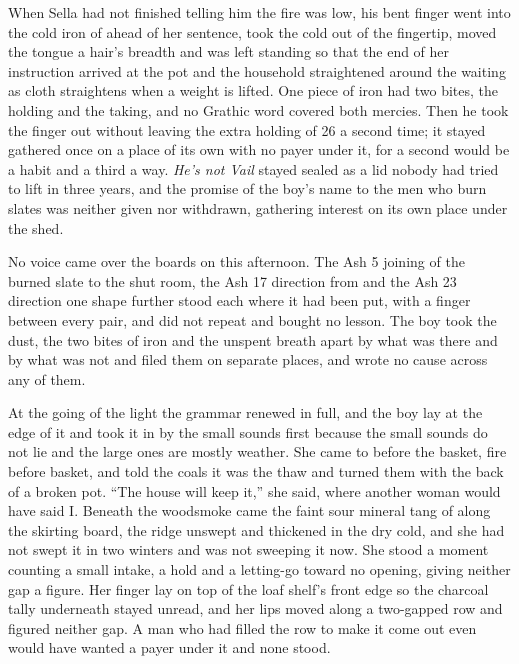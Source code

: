 When Sella had not finished telling him the fire was low, his bent finger went into the cold iron of  ahead of her sentence, took the cold out of the fingertip, moved the tongue a hair's breadth and was left standing so that the end of her instruction arrived at the pot and the household straightened around the waiting as cloth straightens when a weight is lifted. One piece of iron had two bites, the holding and the taking, and no Grathic word covered both mercies. Then he took the finger out without leaving the extra holding of  26 a second time; it stayed gathered once on a place of its own with no payer under it, for a second would be a habit and a third a way. \emph{He's not Vail} stayed sealed as a lid nobody had tried to lift in three years, and the promise of the boy's name to the men who burn slates was neither given nor withdrawn, gathering interest on its own place under the shed.

No voice came over the boards on this afternoon. The Ash 5 joining of the burned slate to the shut room, the Ash 17 direction from  and the Ash 23 direction one shape further stood each where it had been put, with a finger between every pair, and did not repeat and bought no lesson. The boy took the dust, the two bites of iron and the unspent breath apart by what was there and by what was not and filed them on separate places, and wrote no cause across any of them.

\scenebreak

At the going of the light the grammar renewed in full, and the boy lay at the edge of it and took it in by the small sounds first because the small sounds do not lie and the large ones are mostly weather. She came to  before the basket, fire before basket, and told the coals it was the thaw and turned them with the back of a broken pot. “The house will keep it,” she said, where another woman would have said I. Beneath the woodsmoke came the faint sour mineral tang of  along the skirting board, the ridge unswept and thickened in the dry cold, and she had not swept it in two winters and was not sweeping it now. She stood a moment counting a small intake, a hold and a letting-go toward no opening, giving neither gap a figure. Her finger lay on top of the loaf shelf's front edge so the charcoal tally underneath stayed unread, and her lips moved along a two-gapped row and figured neither gap. A man who had filled the row to make it come out even would have wanted a payer under it and none stood.

